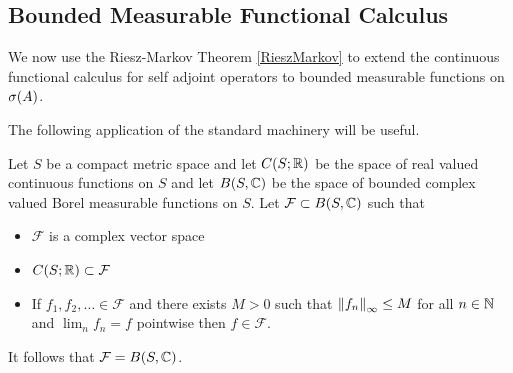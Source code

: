 \subsection{Bounded Measurable Functional Calculus}

We now use the Riesz-Markov Theorem \ref{RieszMarkov} to extend the continuous functional calculus for self adjoint operators to bounded measurable functions on $\sigma(A)$.

The following application of the standard machinery will be useful.

\begin{lem}\label{hilbert:ContinuousToMeasurable}Let $S$ be a compact metric space and let $C(S; \mathbb{R})$ be the space of real valued continuous functions on $S$ and let $B(S, \mathbb{C})$ be the space of bounded complex valued Borel measurable functions on $S$.  Let $\mathcal{F} \subset B(S, \mathbb{C})$ such that 
\begin{itemize}
\item[(i)] $\mathcal{F}$ is a complex vector space
\item[(ii)] $C(S; \mathbb{R}) \subset \mathcal{F}$ 
\item[(iii)] If $f_1, f_2, \dotsc \in \mathcal{F}$ and there exists $M>0$ such that $\left \lVert f_n \right \rVert_\infty \leq M$ for all $n \in \mathbb{N}$ and $\lim_n f_n = f$ pointwise then $f \in \mathcal{F}$.
\end{itemize}
It follows that $\mathcal{F} = B(S, \mathbb{C})$.
\end{lem}
